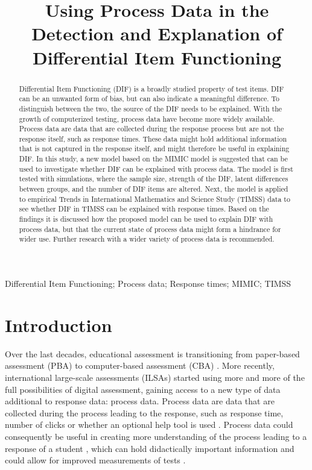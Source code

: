 \documentclass{interact}
\begin{document}
\title{Using Process Data in the Detection and Explanation of Differential Item Functioning}

\author{
}

\maketitle

\begin{abstract}
    Differential Item Functioning (DIF) is a broadly studied property of test items. DIF can be an unwanted form of bias, but can also indicate a meaningful difference. To distinguish between the two, the source of the DIF needs to be explained. With the growth of computerized testing, process data have become more widely available. Process data are data that are collected during the response process but are not the response itself, such as response times. These data might hold additional information that is not captured in the response itself, and might therefore be useful in explaining DIF. In this study, a new model based on the MIMIC model is suggested that can be used to investigate whether DIF can be explained with process data. The model is first tested with simulations, where the sample size, strength of the DIF, latent differences between groups, and the number of DIF items are altered. Next, the model is applied to empirical Trends in International Mathematics and Science Study (TIMSS) data to see whether DIF in TIMSS can be explained with response times. Based on the findings it is discussed how the proposed model can be used to explain DIF with process data, but that the current state of process data might form a hindrance for wider use. Further research with a wider variety of process data is recommended.
\end{abstract}

\begin{keywords}
Differential Item Functioning; Process data; Response times; MIMIC; TIMSS
\end{keywords}


\section{Introduction}
Over the last decades, educational assessment is transitioning from paper-based assessment (PBA) to computer-based assessment (CBA) \parencite{burkhardt2003computer}. More recently, international large-scale assessments (ILSAs) started using more and more of the full possibilities of digital assessment, gaining access to a new type of data additional to response data: process data. Process data are data that are collected during the process leading to the response, such as response time, number of clicks or whether an optional help tool is used \parencite{molenaar2015value, wools2019validity}. Process data could consequently be useful in creating more understanding of the process leading to a response of a student \parencite{han2021sequential}, which can hold didactically important information \parencite{wools2019validity} and could allow for improved measurements of tests \parencite{molenaar2015value, zhang2021accurate}.
\end{document}

